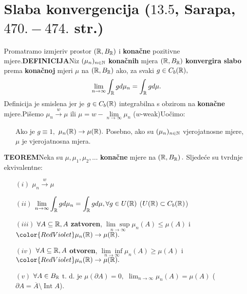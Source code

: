 \documentclass{article}
\newcommand{\Int}{\operatorname{Int}}
\begin{document}
\section{Slaba konvergencija (\textsection \(13.5\), Sarapa, \(470.-474.\) str.)}
Promatramo izmjeriv prostor \(\left(\Bbb R, B_{\Bbb R}\right)\) i \textbf{konačne} pozitivne mjere.\newline\textbf{DEFINICIJA}\newline Niz \((\mu_n)_{n\in\Bbb N}\) \textbf{konačnih} mjera \(\left(\Bbb R,B_{\Bbb R}\right)\) \textbf{konvergira slabo} prema \textbf{konačnoj} mjeri \(\mu\) na \(\left(\Bbb R, B_{\Bbb R}\right)\) ako, za svaki \(g\in C_b(\Bbb R),\) \[\lim_{n\to\infty}\int_{\Bbb R}gd\mu_n=\int_{\Bbb R}gd\mu.\] Definicija je smislena jer je \(g\in C_b(\Bbb R)\) integrabilna s obzirom na \textbf{konačne} mjere.\newline Pišemo \(\mu_n\overset{w}{\longrightarrow}\mu\) ili \(\mu=w-\lim\limits_{n\to\infty}\mu_n\) (\(w\)-weak)\newline\newline Uočimo:
\begin{itemize}
    \item[] Ako je \(g\equiv 1,\) \(\mu_n(\Bbb R)\to\mu(\Bbb R).\) Posebno, ako su \((\mu_n)_{n\in\Bbb N}\) vjerojatnosne mjere, \(\mu\) je vjerojatnosna mjera. 
\end{itemize}
\textbf{TEOREM}\newline Neka su \(\mu,\mu_1,\mu_2,\ldots\) \textbf{konačne} mjere na \(\left(\Bbb R,B_{\Bbb R}\right).\) Sljedeće su tvrdnje ekvivalentne:
\begin{enumerate}
    \item[\((i)\)] \(\mu_n\overset{w}{\longrightarrow}\mu\)
    \item[\((ii)\)] \(\displaystyle\lim_{n\to\infty}\int_{\Bbb R}gd\mu_n=\int_{\Bbb R}gd\mu,\forall g\in U(\Bbb R)\) (\(U(\Bbb R)\subset C_b(\Bbb R)\)) 
    \item[\((iii)\)] \(\forall A\subseteq\Bbb R,A\) \textbf{zatvoren}, \(\underset{n\to\infty}{\lim\sup }\mu_n(A)\le\mu(A)\) i \({\color{RedViolet}\mu_n(\Bbb R)\to\mu(\Bbb R)}.\)
    \item[\((iv)\)] \(\forall A\subseteq\Bbb R,A\) \textbf{otvoren}, \(\underset{n\to\infty}{\lim\inf }\mu_n(A)\ge\mu(A)\) i \({\color{RedViolet}\mu_n(\Bbb R)\to\mu(\Bbb R)}.\)  
    \item[\((v)\)] \(\forall A\in B_{\Bbb R}\) t. d. je \(\mu(\partial A)=0,\) \(\displaystyle\lim_{n\to\infty}\mu_n(A)=\mu(A)\) (\(\partial A=\overline A\setminus\Int A\)).
\end{enumerate}
\end{document}

